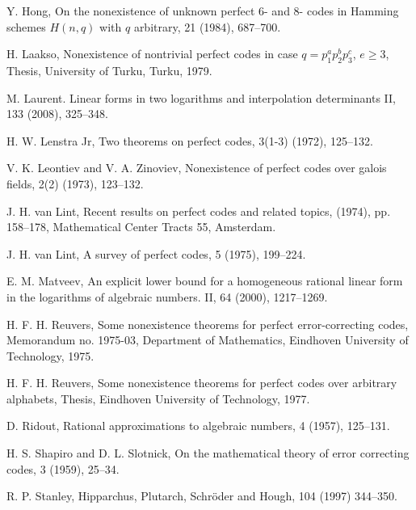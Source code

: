 \documentclass{amsart}
\begin{document}
{\begin{thebibliography}{}
Y. Hong,
\newblock On the nonexistence of unknown perfect $6$- and $8$- codes in Hamming schemes
$H(n, q)$ with $q$ arbitrary, 
 21 (1984), 687--700.

H. Laakso, 
\newblock Nonexistence of nontrivial perfect codes in case 
$q = p_1^a p_2^b p_3^c$, $e \geq 3$,
\newblock Thesis, University of Turku, Turku, 1979.

M. Laurent.
\newblock Linear forms in two logarithms and interpolation determinants {II},
 133 (2008), 325--348.

H. W. Lenstra Jr, 
\newblock Two theorems on perfect codes, 
 3(1-3) (1972), 125--132.

V. K. Leontiev and V. A. Zinoviev, 
\newblock Nonexistence of perfect codes over galois fields,  2(2) (1973), 123--132.

J. H. van Lint, 
\newblock Recent results on perfect codes and related topics,  (1974), pp. 158--178, 
Mathematical Center Tracts 55, Amsterdam.

J. H. van Lint, 
\newblock A survey of perfect codes,
 5 (1975), 199--224.

E. M. Matveev,
\newblock An explicit lower bound for a homogeneous
rational linear form in the logarithms of algebraic
numbers. II,
 64 (2000), 1217--1269.

H. F. H. Reuvers,
\newblock Some nonexistence theorems for perfect error-correcting codes,
\newblock Memorandum no. 1975-03, Department of Mathematics, Eindhoven University of Technology, 1975.

H. F. H. Reuvers,
\newblock Some nonexistence theorems for perfect codes 
over arbitrary alphabets,
\newblock Thesis, Eindhoven University of Technology, 1977.

D. Ridout, 
\newblock Rational approximations to algebraic numbers, 
 4 (1957), 125--131.

H. S. Shapiro and  D. L. Slotnick,
\newblock On the mathematical theory of error correcting codes,
 3 (1959), 25--34.

R. P. Stanley, 
\newblock Hipparchus, Plutarch, Schr\"oder and Hough, 
104 (1997) 344--350.


\end{thebibliography}}
\end{document}
